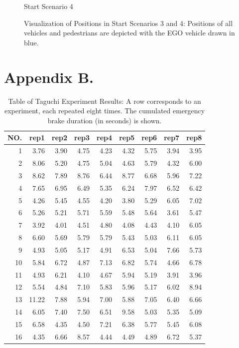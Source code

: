 \begin{figure}[ht]
\begin{minipage}[b]{0.5\linewidth}
		Start Scenario 4
	\end{minipage} 
	\caption{Visualization of Positions in Start Scenarios 3 and 4: Positions of all vehicles and pedestrians are depicted with the EGO vehicle drawn in blue.}
	\label{fig:appendix:start_scenarios_3_4} 
\end{figure}


\chapter{Appendix B.}

\begin{table}[ht]
	\centering
	\begin{tabular}{ rrrrrrrrr }
		\hline
		NO.& rep1 & rep2 & rep3 & rep4 & rep5 & rep6 & rep7 & rep8\\
  		\hline
		1 & 3.76 & 3.90 & 4.75 & 4.23 & 4.32 & 5.75 & 3.94 & 3.95 \\ 
		2 & 8.06 & 5.20 & 4.75 & 5.04 & 4.63 & 5.79 & 4.32 & 6.00 \\ 
		3 & 8.62 & 7.89 & 8.76 & 6.44 & 8.77 & 6.68 & 5.96 & 7.22 \\ 
		4 & 7.65 & 6.95 & 6.49 & 5.35 & 6.24 & 7.97 & 6.52 & 6.42 \\ 
		5 & 4.26 & 5.45 & 4.55 & 4.20 & 3.80 & 5.29 & 6.05 & 7.02 \\ 
		6 & 5.26 & 5.21 & 5.71 & 5.59 & 5.48 & 5.64 & 3.61 & 5.47 \\ 
		7 & 3.92 & 4.01 & 4.51 & 4.80 & 4.08 & 4.43 & 4.10 & 6.05 \\ 
		8 & 6.60 & 5.69 & 5.79 & 5.79 & 5.43 & 5.03 & 6.11 & 6.05 \\ 
		9 & 4.93 & 5.05 & 5.17 & 4.91 & 6.53 & 5.04 & 7.66 & 5.73 \\ 
		10 & 5.84 & 6.72 & 4.87 & 7.13 & 6.82 & 5.74 & 4.66 & 6.78 \\ 
		11 & 4.93 & 6.21 & 4.10 & 4.67 & 5.94 & 5.19 & 3.91 & 3.96 \\ 
		12 & 5.54 & 4.84 & 7.10 & 5.83 & 5.96 & 5.17 & 6.02 & 8.94 \\ 
		13 & 11.22 & 7.88 & 5.94 & 7.00 & 5.88 & 7.05 & 6.40 & 6.66 \\ 
		14 & 6.05 & 7.40 & 7.50 & 6.51 & 9.58 & 5.03 & 5.35 & 5.09 \\ 
		15 & 6.58 & 4.35 & 4.50 & 7.21 & 6.38 & 5.77 & 5.45 & 6.08 \\ 
		16 & 4.35 & 6.66 & 8.57 & 4.44 & 4.49 & 4.89 & 6.72 & 5.37 \\ 
		\hline
	\end{tabular}
	\caption{Table of Taguchi Experiment Results: A row corresponds to an experiment, each repeated eight times. The cumulated emergency brake duration (in seconds) is shown.}
	\label{tab:appendix:hyperparameter_tuning_final_taguchi}
\end{table}

